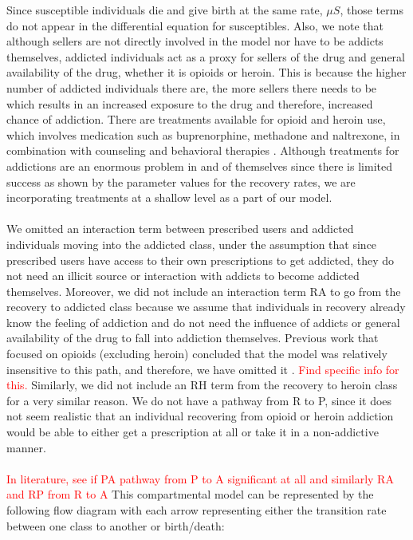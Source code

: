 \documentclass[12pt]{article}
\begin{document}
Since susceptible individuals die and give birth at the same rate, $\mu S$, those terms do not appear in the differential equation for susceptibles. Also, we note that although sellers are not directly involved in the model nor have to be addicts themselves, addicted individuals act as a proxy for sellers of the drug and general availability of the drug, whether it is opioids or heroin. This is because the higher number of addicted individuals there are, the more sellers there needs to be which results in an increased exposure to the drug and therefore, increased chance of addiction. There are treatments available for opioid and heroin use, which involves medication such as buprenorphine, methadone and naltrexone, in combination with counseling and behavioral therapies \cite{SAMSHA1}. Although treatments for addictions are an enormous problem in and of themselves since there is limited success as shown by the parameter values for the recovery rates, we are incorporating treatments at a shallow level as a part of our model.   \\ \\
We omitted an interaction term between prescribed users and addicted individuals moving into the addicted class, under the assumption that since prescribed users have access to their own prescriptions to get addicted, they do not need an illicit source or interaction with addicts to become addicted themselves. Moreover, we did not include an interaction term RA to go from the recovery to addicted class because we assume that individuals in recovery already know the feeling of addiction and do not need the influence of addicts or general availability of the drug to fall into addiction themselves. Previous work that focused on opioids (excluding heroin) concluded that the model was relatively insensitive to this path, and therefore, we have omitted it \cite{Strickland}. \textcolor{red}{Find specific info for this.} Similarly, we did not include an RH term from the recovery to heroin class for a very similar reason. We do not have a pathway from R to P, since it does not seem realistic that an individual recovering from opioid or heroin addiction would be able to either get a prescription at all or take it in a non-addictive manner.\\ \\
\textcolor{red}{In literature, see if PA pathway from P to A significant at all and similarly RA and RP from R to A} 
This compartmental model can be represented by the following flow diagram with each arrow representing either the transition rate between one class to another or birth/death: 
\end{document}
